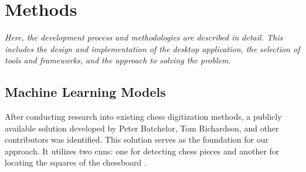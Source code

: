 \chapter{Methods}
\label{chp:methods}







\begin{center}
    \textit{Here, the development process and methodologies are described in detail. This includes the design and implementation of the desktop application, the selection of tools and frameworks, and the approach to solving the problem.}
\end{center}



\section{Machine Learning Models}
\label{sec:ml-models}

After conducting research into existing chess digitization methods, a publicly available solution developed by Peter Batchelor, Tom Richardson, and other contributors was identified. This solution serves as the foundation for our approach. It utilizes two \glspl{cnn}: one for detecting chess pieces and another for locating the squares of the chessboard \cite{lichess:chesscam}. \\

